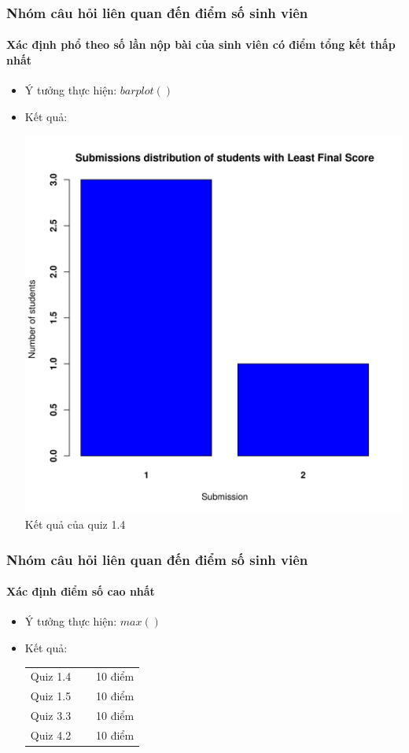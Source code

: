 \documentclass[english,10pt,table]{beamer}
\begin{document}
\frame
{
\frametitle{Nhóm câu hỏi liên quan đến điểm số sinh viên}
\framesubtitle{Xác định phổ theo số lần nộp bài của sinh viên có điểm tổng kết thấp nhất}
\begin{itemize}
    \item Ý tưởng thực hiện: $barplot()$
    \item Kết quả:\\
    \begin{center}
        \includegraphics[width = 6 cm]{Images/img2-2-1.png}\\
        Kết quả của quiz 1.4
    \end{center}
\end{itemize}
}

\frame
{
\frametitle{Nhóm câu hỏi liên quan đến điểm số sinh viên}
\framesubtitle{Xác định điểm số cao nhất}
\begin{itemize}
    \item Ý tưởng thực hiện: $max()$
    \item Kết quả:\\
    \begin{center}
        \begin{tabular}{l l r}
             Quiz 1.4 & $\;$ & 10 điểm\\
             Quiz 1.5 & $\;$ & 10 điểm\\
             Quiz 3.3 & $\;$ & 10 điểm\\
             Quiz 4.2 & $\;$ & 10 điểm
        \end{tabular}
    \end{center}
\end{itemize}
}
\end{document}
